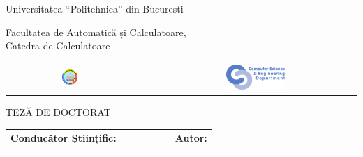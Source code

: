\begin{titlepage}
	\begin{center}
		{\Large Universitatea ``Politehnica'' din București}
		\par\vspace*{2mm}
		{\Large Facultatea de Automatică și Calculatoare,\\
		 Catedra de Calculatoare}
		\par\vspace*{3mm}
		\begin{table}[h]
        	\begin{center}
				\begin{tabular}{cccc}
                    \includegraphics[width=0.13\textwidth]{src/img/branding/upb}
					& & &
					\includegraphics[width=0.30\textwidth]{src/img/branding/cs}
            	\end{tabular}
			\end{center}
		\end{table}
		
		\par\vspace*{35mm}
		{\Huge TEZĂ DE DOCTORAT}
		\par\vspace*{15mm}
		{\Huge \VARtitlero }
		\par\vspace*{35mm}
		\begin{table}[h]
        	\begin{center}
				\begin{tabular}{lcccccl}
					\Large \textbf{\Large Conducător Științific:}
					\vspace*{1mm} &&&&&& \Large \textbf{\Large Autor:}\vspace*{1mm} \\
					\Large \VARadviser &&&&&& \Large \VARauthor
				\end{tabular}
			\end{center}
		\end{table}

		\par\vspace*{40mm}
		\Large \VARtitlefooterro
	\end{center}
\end{titlepage}
